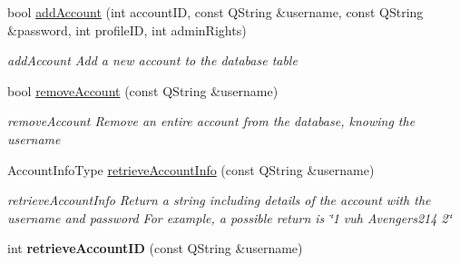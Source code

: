 \begin{DoxyCompactItemize}
bool \hyperlink{classAccountDB_a18a8ac09ee458a88e71e492fbb62a1c7}{add\+Account} (int account\+ID, const Q\+String \&username, const Q\+String \&password, int profile\+ID, int admin\+Rights)
\begin{DoxyCompactList}\small\item\em add\+Account Add a new account to the database table \end{DoxyCompactList}\item 
bool \hyperlink{classAccountDB_a746a8d486264cea34e566d5b50425ebc}{remove\+Account} (const Q\+String \&username)
\begin{DoxyCompactList}\small\item\em remove\+Account Remove an entire account from the database, knowing the username \end{DoxyCompactList}\item 
Account\+Info\+Type \hyperlink{classAccountDB_af8828222707ed6130b414565f18be2bc}{retrieve\+Account\+Info} (const Q\+String \&username)
\begin{DoxyCompactList}\small\item\em retrieve\+Account\+Info Return a string including details of the account with the username and password For example, a possible return is \char`\"{}1 vuh Avengers214 2\char`\"{} \end{DoxyCompactList}\item 
int {\bfseries retrieve\+Account\+ID} (const Q\+String \&username)\hypertarget{classAccountDB_af423a6865c2f78f204375deee4553096}{}\label{classAccountDB_af423a6865c2f78f204375deee4553096}


\end{DoxyCompactItemize}
